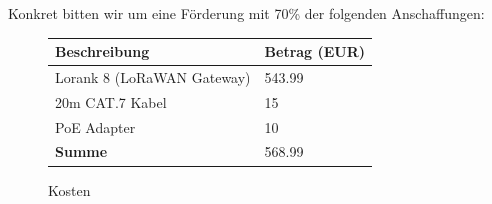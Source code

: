 \documentclass[11pt]{article}
\begin{document}
Konkret bitten wir um eine Förderung  mit 70\% der folgenden Anschaffungen:
\\
\begin{figure}[h]
	\begin{center}
		\begin{tabular}{l l}
			\textbf{Beschreibung} & \textbf{Betrag (EUR)} \\
			\hline
			Lorank 8 (LoRaWAN Gateway) & 543.99 \\
			20m CAT.7 Kabel & 15 \\
			PoE Adapter & 10 \\
			\hline
			\textbf{Summe} & 568.99 \\
		\end{tabular}
	\end{center}
	\label{fig:costs}
	\caption{Kosten}
\end{figure}
\end{document}
